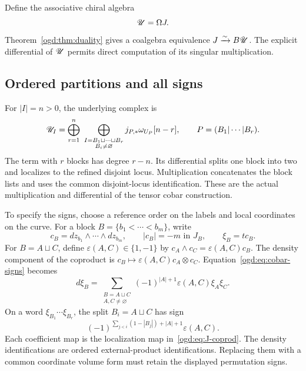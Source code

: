Define the associative chiral algebra
\begin{equation}\label{ogd:eq:U}
 \mathscr U=\Omega J.
\end{equation}
Theorem~\ref{ogd:thm:duality} gives a coalgebra equivalence \(J\xrightarrow{\sim}B\mathscr U\).
The explicit differential of \(\mathscr U\) permits direct computation of its singular multiplication.

\subsection{Ordered partitions and all signs}

For \(|I|=n>0\), the underlying complex is
\begin{equation}\label{ogd:eq:U-partitions}
 \mathscr U_I=
 \bigoplus_{r=1}^{n}\ \bigoplus_{\substack{I=B_1\sqcup\cdots\sqcup B_r\\B_i\ne\varnothing}}
 j_{P,*}\omega_{U_P}[n-r],
 \qquad P=(B_1|\cdots|B_r).
\end{equation}
The term with \(r\) blocks has degree \(r-n\).
Its differential splits one block into two and localizes to the refined disjoint locus.
Multiplication concatenates the block lists and uses the common disjoint-locus identification.
These are the actual multiplication and differential of the tensor cobar construction.

To\label{ogd:def:block-density-generators} specify the signs, choose a reference order on the labels and local coordinates on the curve.
For a block \(B=\{b_1<\cdots<b_m\}\), write
\[
 c_B=dz_{b_1}\wedge\cdots\wedge dz_{b_m},
 \qquad |c_B|=-m\text{ in }J_B,
 \qquad \xi_B=tc_B.
\]
For \(B=A\sqcup C\), define \(\varepsilon(A,C)\in\{1,-1\}\) by
\(c_A\wedge c_C=\varepsilon(A,C)c_B\).
The density component of the coproduct is
\(c_B\mapsto\varepsilon(A,C)c_A\otimes c_C\).
Equation~\eqref{ogd:eq:cobar-signs} becomes
\begin{equation}\label{ogd:eq:partition-sign}
 d\xi_B=\sum_{\substack{B=A\sqcup C\\A,C\ne\varnothing}}
       (-1)^{|A|+1}\varepsilon(A,C)\xi_A\xi_C.
\end{equation}
On a word \(\xi_{B_1}\cdots\xi_{B_r}\), the split \(B_i=A\sqcup C\) has sign
\begin{equation}\label{ogd:eq:word-sign}
 (-1)^{\sum_{j<i}(1-|B_j|)+|A|+1}\varepsilon(A,C).
\end{equation}
Each coefficient map is the localization map in~\eqref{ogd:eq:J-coprod}.
The density identifications are ordered external-product identifications.
Replacing them with a common coordinate volume form must retain the displayed permutation signs.

